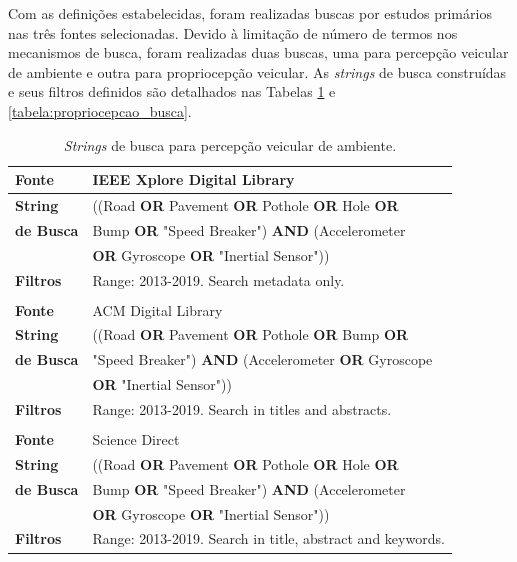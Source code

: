 Com as definições estabelecidas, foram realizadas buscas por estudos primários nas três fontes selecionadas. Devido à limitação de número de termos nos mecanismos de busca, foram realizadas duas buscas, uma para percepção veicular de ambiente e outra para propriocepção veicular. As \textit{strings} de busca construídas e seus filtros definidos são detalhados nas Tabelas \ref{tabela:percepcao_ambiente_busca} e \ref{tabela:propriocepcao_busca}.

\begin{table}[h!]
    \caption{\textit{Strings} de busca para percepção veicular de ambiente.}
    \label{tabela:percepcao_ambiente_busca}
    \centering
    \begin{tabular}{l l}
        
        \toprule
        \textbf{Fonte} & IEEE Xplore Digital Library \\
        \midrule
        \textbf{String} & ((Road \textbf{OR} Pavement \textbf{OR} Pothole \textbf{OR} Hole \textbf{OR} \\ \textbf{de Busca} & Bump \textbf{OR} "Speed Breaker")  \textbf{AND} (Accelerometer \\ & \textbf{OR} Gyroscope \textbf{OR} "Inertial Sensor")) \\
        \midrule
        \textbf{Filtros} & Range: 2013-2019. Search metadata only. \\
        \bottomrule
        
        \\
        
        \toprule
        \textbf{Fonte} & ACM Digital Library \\
        \midrule
        \textbf{String} & ((Road \textbf{OR} Pavement \textbf{OR} Pothole \textbf{OR} Bump \textbf{OR} \\ \textbf{de Busca} & "Speed Breaker") \textbf{AND} (Accelerometer \textbf{OR} Gyroscope \\ & \textbf{OR} "Inertial Sensor")) \\
        \midrule
        \textbf{Filtros} & Range: 2013-2019. Search in titles and abstracts. \\ 
        \bottomrule
        
        \\
        
        \toprule
        \textbf{Fonte} & Science Direct \\
        \midrule
        \textbf{String} & ((Road \textbf{OR} Pavement \textbf{OR} Pothole \textbf{OR} Hole \textbf{OR} \\ \textbf{de Busca} & Bump \textbf{OR} "Speed Breaker") \textbf{AND} (Accelerometer \\ & \textbf{OR} Gyroscope \textbf{OR} "Inertial Sensor")) \\
        \midrule
        \textbf{Filtros} & Range: 2013-2019. Search in title, abstract and keywords. \\
        \bottomrule
    \end{tabular}
\end{table}

